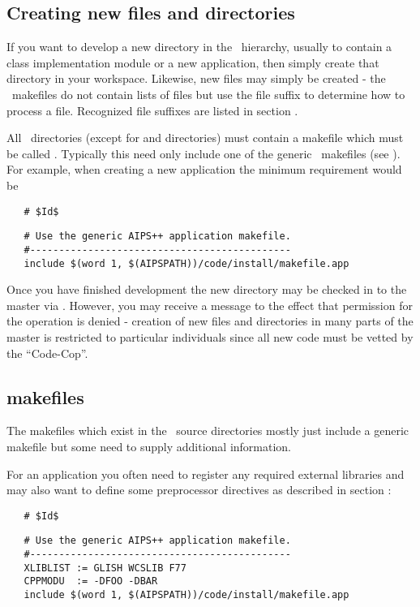 \subsection*{Creating new files and directories}

If you want to develop a new directory in the \aipspp\ hierarchy, usually to
contain a class implementation module or a new application, then simply create
that directory in your workspace.  Likewise, new files may simply be created -
the \aipspp\ makefiles do not contain lists of files but use the file suffix
to determine how to process a file.  Recognized file suffixes are listed in
section .

All \aipspp\ directories (except for  and 
directories) must contain a makefile which must be called .
Typically this need only include one of the generic \aipspp\ makefiles (see
).  For example, when creating a new application the minimum
requirement would be

\noindent
\verb+   # $+\verb+Id$+

\begin{verbatim}
   # Use the generic AIPS++ application makefile.
   #---------------------------------------------
   include $(word 1, $(AIPSPATH))/code/install/makefile.app
\end{verbatim}

\noindent
Once you have finished development the new directory may be checked in to the
master via .  However, you may receive a message to the effect that
permission for the operation is denied - creation of new files and directories
in many parts of the master is restricted to particular individuals since all
new code must be vetted by the ``Code-Cop''.

\subsection*{makefiles}

The makefiles which exist in the \aipspp\ source directories mostly just
include a generic makefile but some need to supply additional information.

For an application you often need to register any required external libraries
and may also want to define some preprocessor directives as described in
section :

\noindent
\verb+   # $+\verb+Id$+

\begin{verbatim}
   # Use the generic AIPS++ application makefile.
   #---------------------------------------------
   XLIBLIST := GLISH WCSLIB F77
   CPPMODU  := -DFOO -DBAR
   include $(word 1, $(AIPSPATH))/code/install/makefile.app
\end{verbatim}

